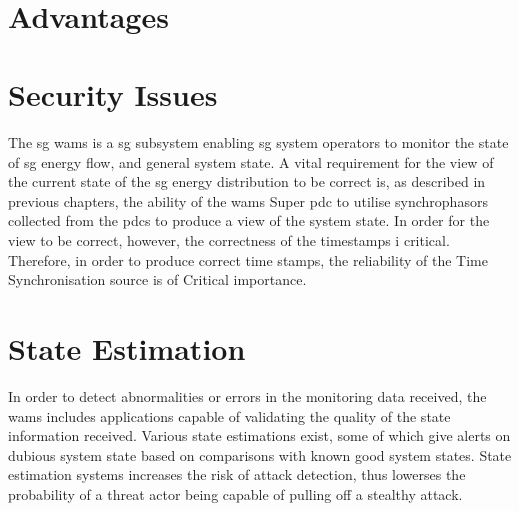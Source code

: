 \
 






\section{Advantages}
\section{Security Issues}

The \acrfull{sg} \acrfull{wams} is a \acrshort{sg} subsystem enabling \acrshort{sg} system operators to monitor the state of \acrshort{sg} energy flow, and general system state. 
A vital requirement for the view of the current state of the \acrshort{sg} energy distribution to be correct is, as described in previous chapters, the ability of the \acrshort{wams} Super \acrshort{pdc}  to utilise synchrophasors collected from the \acrshort{pdc}s to produce a view of the system state. In order for the view to be correct, however, the correctness of the timestamps i critical.  Therefore, in order to produce correct time stamps, the reliability of the Time Synchronisation source is of Critical importance.


\section{State Estimation}


In order to detect abnormalities or errors in the monitoring data received, the \acrshort{wams} includes applications capable of validating the quality of the state information received. Various state estimations exist, some of which give alerts on dubious system state based on comparisons with known good system states. State estimation systems increases the risk of attack detection, thus lowerses the probability of a threat actor being capable of pulling off a stealthy attack.   


